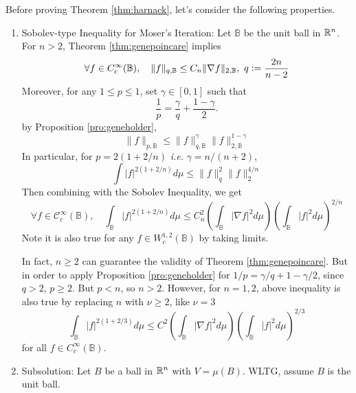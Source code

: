 \noindent Before proving Theorem \ref{thm:harnack}, let's consider the following properties.
\begin{enumerate}[label=\Roman*.]
	\item Sobolev-type Inequality for Moser's Iteration: Let $\mathbb{B}$ be the unit ball in $\mathbb{R}^n$. For $n > 2$, Theorem \ref{thm:genepoincare} implies
	\begin{equation*}
		\forall f \in C_c^{\infty}(\mathbb{B}), \quad\|f\|_{q, \mathbb{B}} \leq C_n\|\nabla f\|_{2, \mathbb{B}},~q \vcentcolon= \frac{2n}{n-2}
	\end{equation*}
	Moreover, for any $1 \leq p \leq 1$, set $\gamma \in [0,1]$ such that
	\begin{equation*}
		\frac{1}{p}=\frac{\gamma}{q}+\frac{1-\gamma}{2} .
	\end{equation*}
	by Proposition \ref{pro:geneholder},
	\begin{equation*}
		\|f\|_{p, \mathbb{B}} \leq\|f\|_{q, \mathbb{B}}^\gamma\|f\|_{2, \mathbb{B}}^{1-\gamma}
	\end{equation*}
	In particular, for $p = 2(1+2/n)$ \emph{i.e.} $\gamma = n / (n+2)$,
	\begin{equation*}
		\int|f|^{2(1+2 / n)} d \mu \leq\|f\|_q^2\|f\|_2^{4 / n}
	\end{equation*}
	Then combining with the Sobolev Inequality, we get
	\begin{equation}\label{eq:ineqmose}
		\forall f \in \mathcal{C}_c^{\infty}(\mathbb{B}), \quad \int_{\mathbb{B}}|f|^{2(1+2 / n)} d \mu \leq C_n^2\left(\int_{\mathbb{B}}|\nabla f|^2 d \mu\right)\left(\int_{\mathbb{B}}|f|^2 d \mu\right)^{2 / n}
	\end{equation}
	Note it is also true for any $f \in W_c^{1,2}(\mathbb{B})$ by taking limits.

	\noindent In fact, $n \geq 2$ can guarantee the validity of Theorem \ref{thm:genepoincare}. But in order to apply Proposition \ref{pro:geneholder} for ${1}/{p}={\gamma}/{q}+{1-\gamma}/{2}$, since $q > 2$, $p \geq 2$. But $p < n$, so $n > 2$. However, for $n = 1,2$, above inequality is also true by replacing $n$ with $\nu \geq 2$, like $\nu = 3$
	\begin{equation}\label{eq:mineqmose}
		\int_{\mathbb{B}}|f|^{2(1+2 / 3)} d \mu \leq C^2\left(\int_{\mathbb{B}}|\nabla f|^2 d \mu\right)\left(\int_{\mathbb{B}}|f|^2 d \mu\right)^{2 / 3}
	\end{equation}
	for all $f \in C_c^\infty(\mathbb{B})$.

	\item Subsolution: Let $B$ be a ball in $\mathbb{R}^n$ with $V = \mu(B)$. WLTG, assume $B$ is the unit ball. 


\end{enumerate}
